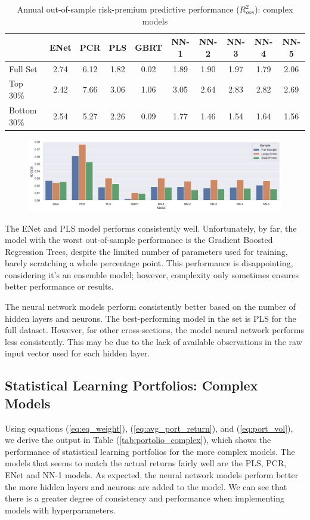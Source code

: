 \begin{table}[ht]
	\centering
	\caption{Annual out-of-sample risk-premium predictive performance ($R^2_{oos}$): complex models}
	\begin{tabular}[t]{lccccccccc}
		\toprule
		&ENet&PCR&PLS&GBRT&NN-1&NN-2&NN-3&NN-4&NN-5\\
		\midrule
		Full Set&2.74&6.12&1.82&0.02&1.89&1.90&1.97&1.79&2.06\\	
		Top 30\%&2.42&7.66&3.06&1.06&3.05&2.64&2.83&2.82&2.69\\
		Bottom 30\%&2.54&5.27&2.26&0.09&1.77&1.46&1.54&1.64&1.56\\			   
		\bottomrule
	\end{tabular}\label{tab:prediction_complex}
\end{table}
\vspace{-7mm}
\begin{figure}[h]
	\centering
	\includegraphics[width=15cm]{content/images/r2_complex}
\end{figure}

The ENet and PLS model performs consistently well. Unfortunately, by far, the model with the worst out-of-sample performance is the Gradient Boosted Regression Trees, despite the limited number of parameters used for training, barely scratching a whole percentage point. This performance is disappointing, considering it's an ensemble model; however, complexity only sometimes ensures better performance or results.

The neural network models perform consistently better based on the number of hidden layers and neurons. The best-performing model in the set is PLS for the full dataset. However, for other cross-sections, the model neural network performs less consistently. This may be due to the lack of available observations in the raw input vector used for each hidden layer.

\subsection{Statistical Learning Portfolios: Complex Models}
Using equations (\ref{eq:eq_weight}), (\ref{eq:avg_port_return}), and (\ref{eq:port_vol}), we derive the output in Table (\ref{tab:portolio_complex}), which shows the performance of statistical learning portfolios for the more complex models. The models that seems to match the actual returns fairly well are the PLS, PCR, ENet and NN-1 models. As expected, the neural network models perform better the more hidden layers and neurons are added to the model. We can see that there is a greater degree of consistency and performance when implementing models with hyperparameters.

